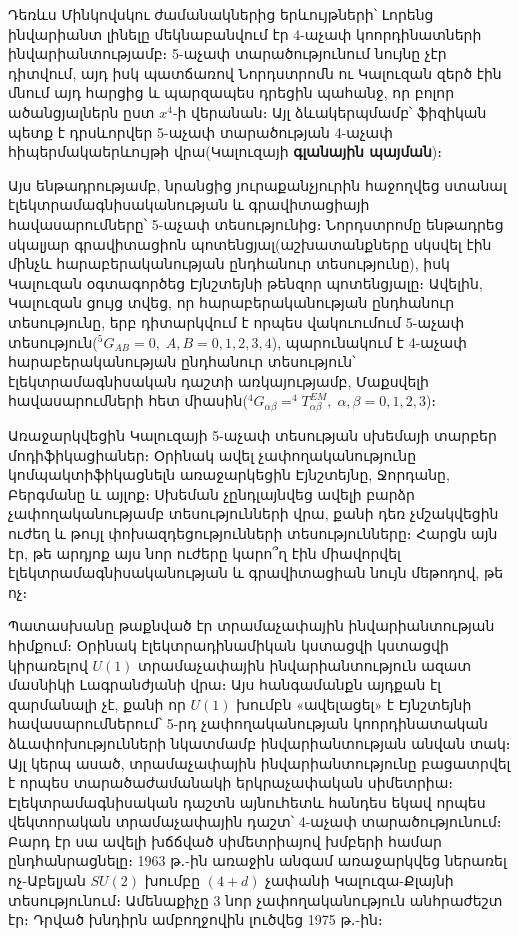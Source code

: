 \documentclass[12pt,a4paper]{article}
\begin{document}
Դեռևս Մինկովսկու ժամանակներից երևույթների՝ Լորենց ինվարիանտ լինելը
մեկնաբանվում էր 4-աչափ կոորդինատների ինվարիանտությամբ։ 5-աչափ տարածությունում
նույնը չէր դիտվում, այդ իսկ պատճառով Նորդստրոմն ու Կալուզան զերծ էին
մնում այդ հարցից և պարզապես դրեցին պահանջ, որ բոլոր ածանցյալներն ըստ
$x^{4}$-ի վերանան։ Այլ ձևակերպմամբ՝ ֆիզիկան պետք է դրսևորվեր 5-աչափ
տարածության 4-աչափ հիպերմակաերևույթի վրա(Կալուզայի \textbf{գլանային
պայման})։

Այս ենթադրությամբ, նրանցից յուրաքանչյուրին հաջողվեց ստանալ էլեկտրամագնիսականության
և գրավիտացիայի հավասարումները՝ 5-աչափ տեսությունից։ Նորդստրոմը ենթադրեց
սկալյար գրավիտացիոն պոտենցյալ(աշխատանքները սկսվել էին մինչև հարաբերականության
ընդհանուր տեսությունը), իսկ Կալուզան օգտագործեց Էյնշտեյնի թենզոր պոտենցյալը։
Ավելին, Կալուզան ցույց տվեց, որ հարաբերականության ընդհանուր տեսությունը,
երբ դիտարկվում է որպես վակուումում 5-աչափ տեսություն($^{5}G_{AB}=0,\;A,B=0,1,2,3,4$),
պարունակում է 4-աչափ հարաբերականության ընդհանուր տեսություն՝ էլեկտրամագնիսական
դաշտի առկայությամբ, Մաքսվելի հավասարումների հետ միասին($^{4}G_{\alpha\beta}=^{4}T_{\alpha\beta}^{EM},\;\alpha,\beta=0,1,2,3$)։

Առաջարկվեցին Կալուզայի 5-աչափ տեսության սխեմայի տարբեր մոդիֆիկացիաներ։
Օրինակ ավել չափողականությունը կոմպակտիֆիկացնելն առաջարկեցին Էյնշտեյնը,
Ջորդանը, Բերգմանը և այլոք։ Սխեման չընդլայնվեց ավելի բարձր չափողականությամբ
տեսությունների վրա, քանի դեռ չմշակվեցին ուժեղ և թույլ փոխազդեցությունների
տեսությունները։ Հարցն այն էր, թե արդյոք այս նոր ուժերը կարո՞ղ էին
միավորվել էլեկտրամագնիսականության և գրավիտացիան նույն մեթոդով, թե
ոչ։

Պատասխանը թաքնված էր տրամաչափային ինվարիանտության հիմքում։ Օրինակ
էլեկտրադինամիկան կստացվի կստացվի կիրառելով $U(1)$ տրամաչափային ինվարիանտություն
ազատ մասնիկի Լագրանժյանի վրա։ Այս հանգամանքն այդքան էլ զարմանալի չէ,
քանի որ $U(1)$ խումբն «ավելացել» է Էյնշտեյնի հավասարումներում՝ 5-րդ
չափողականության կոորդինատական ձևափոխությունների նկատմամբ ինվարիանտության
անվան տակ։ Այլ կերպ ասած, տրամաչափային ինվարիանտությունը բացատրվել
է որպես տարածաժամանակի երկրաչափական սիմետրիա։ Էլեկտրամագնիսական դաշտն
այնուհետև հանդես եկավ որպես վեկտորական տրամաչափային դաշտ՝ 4-աչափ տարածությունում։
Բարդ էր սա ավելի խճճված սիմետրիայով խմբերի համար ընդհանրացնելը։ 1963
թ․-ին առաջին անգամ առաջարկվեց ներառել ոչ-Աբելյան $SU(2)$ խումբը $(4+d)$
չափանի Կալուզա-Քլայնի տեսությունում։ Ամենաքիչը 3 նոր չափողականություն
անհրաժեշտ էր։ Դրված խնդիրն ամբողջովին լուծվեց 1975 թ․-ին։
\begin{thebibliography}{1}

\end{thebibliography}
\end{document}
